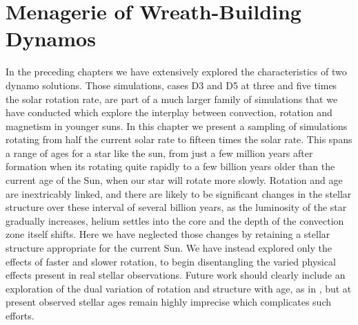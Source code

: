 \chapter{Menagerie of Wreath-Building Dynamos}
\label{chapter:menagerie of dynamos}

In the preceding chapters we have extensively explored the
characteristics of two dynamo solutions.  Those simulations, cases D3
and D5 at three and five times the solar rotation rate, are part of a
much larger family of simulations that we have conducted which explore
the interplay between convection, rotation and magnetism in younger
suns.  In this chapter we present a sampling of simulations rotating
from half the current solar rate to fifteen times the solar rate.
This spans a range of ages for a star like the sun, from just a few
million years after formation when its rotating quite rapidly to a few
billion years older than the current age of the Sun, when our star
will rotate more slowly.  Rotation and age are inextricably linked,
and there are likely to be significant changes in the stellar
structure over these interval of several billion years, as the
luminosity of the star gradually increases, helium settles into the
core and the depth of the convection zone itself shifts.  Here we have neglected 
those changes by retaining a stellar structure appropriate for the
current Sun.  We have instead explored only the effects of faster and
slower rotation, to begin disentangling the varied physical
effects present in real stellar observations.  Future work should
clearly include an exploration of the dual variation of rotation and
structure with age, as in \cite{Ballot_et_al_2007}, but at present
observed stellar ages remain highly imprecise which complicates such efforts.

